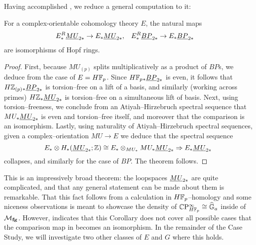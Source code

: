 Having accomplished , we reduce a general computation to it:

\begin{corollary}\label{HopfRingForEBP}
For a complex-orientable cohomology theory $E$, the natural maps
\begin{align*}
E_*^R \underline{\smash{MU}}_{2*} & \to E_* \underline{\smash{MU}}_{2*}, &
E_*^R \underline{\smash{BP}}_{2*} & \to E_* \underline{\smash{BP}}_{2*}
\end{align*}
are isomorphisms of Hopf rings.
\end{corollary}
\begin{proof}
First, because $MU_{(p)}$ splits multiplicatively as a product of $BP$s, we deduce from  the case of $E = H\mathbb F_p$.  Since $H\mathbb F_p{}_* \underline{\smash{BP}}_{2*}$ is even, it follows that $H\mathbb Z_{(p)}{}_* \underline{\smash{BP}}_{2*}$ is torsion--free on a lift of a basis, and similarly (working across primes) $H\mathbb Z_* \underline{\smash{MU}}_{2*}$ is torsion--free on a simultaneous lift of basis.  Next, using torsion--freeness, we conclude from an Atiyah--Hirzebruch spectral sequence that $MU_* \underline{\smash{MU}}_{2*}$ is even and torsion--free itself, and moreover that the comparison is an isomorphism.  Lastly, using naturality of Atiyah--Hirzebruch spectral sequences, given a complex--orientation $MU \to E$ we deduce that the spectral sequence \[E_* \otimes H_*(\underline{\smash{MU}}_{2*}; \mathbb Z) \cong E_* \otimes_{MU_*} MU_* \underline{\smash{MU}}_{2*} \Rightarrow E_* \underline{\smash{MU}}_{2*}\] collapses, and similarly for the case of $BP$.  The theorem follows.
\end{proof}

This is an impressively broad theorem: the loopspaces $\underline{\smash{MU}}_{2*}$ are quite complicated, and that any general statement can be made about them is remarkable.  That this fact follows from a calculation in $H\mathbb F_p$--homology and some niceness observations is meant to showcase the density of $\mathbb{C}\mathrm P^\infty_{H\mathbb F_p} \cong \widehat{\mathbb G}_a$ inside of $\mathcal{M}_{\mathbf{fg}}$.  However,  indicates that this Corollary does not cover all possible cases that the comparison map in  becomes an isomorphism.  In the remainder of the Case Study, we will investigate two other classes of $E$ and $G$ where this holds.









